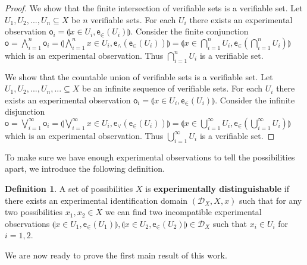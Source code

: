 \documentclass[preprint]{elsarticle}
\theoremstyle{plain}%
\theoremstyle{definition}
\newtheorem{defn}{Definition}[section]
\theoremstyle{remark}
\begin{document}
\begin{proof}
	We show that the finite intersection of verifiable sets is a verifiable set. Let $U_1, U_2, ... , U_n \subseteq X$ be $n$ verifiable sets. For each $U_i$ there exists an experimental observation $\mathsf{o}_i = \llparenthesis x\in U_i, \mathsf{e}_\in(U_i) \rrparenthesis$. Consider the finite conjunction $\mathsf{o} = \bigwedge\limits_{i=1}^{n} \mathsf{o}_i = \llparenthesis \bigwedge\limits_{i=1}^{n} x\in U_i , \mathsf{e}_{\wedge}(\mathsf{e}_\in(U_i)) \rrparenthesis=\llparenthesis x\in \bigcap\limits_{i=1}^{n} U_i, \mathsf{e}_\in(\bigcap\limits_{i=1}^{n} U_i)\rrparenthesis$ which is an experimental observation. Thus $\bigcap\limits_{i=1}^{n} U_i$ is a verifiable set.
	
	We show that the countable union of verifiable sets is a verifiable set. Let $U_1, U_2, ... , U_n, ... \subseteq X$ be an infinite sequence of verifiable sets. For each $U_i$ there exists an experimental observation $\mathsf{o}_i = \llparenthesis x\in U_i, \mathsf{e}_\in(U_i)\rrparenthesis$. Consider the infinite disjunction $\mathsf{o} = \bigvee\limits_{i=1}^{\infty} \mathsf{o}_i = \llparenthesis\bigvee\limits_{i=1}^{\infty} x\in U_i, \mathsf{e}_{\vee}(\mathsf{e}_\in(U_i))\rrparenthesis=\llparenthesis x\in \bigcup\limits_{i=1}^{\infty} U_i, \mathsf{e}_\in(\bigcup\limits_{i=1}^{\infty} U_i)\rrparenthesis$ which is an experimental observation. Thus $\bigcup\limits_{i=1}^{\infty} U_i$ is a verifiable set.
\end{proof}

To make sure we have enough experimental observations to tell the possibilities apart, we introduce the following definition.

\begin{defn}
A set of possibilities $X$ is \textbf{experimentally distinguishable} if there exists an experimental identification domain $(\mathcal{D}_X, X, x)$ such that for any two possibilities $x_1, x_2 \in X$ we can find two incompatible experimental observations $\llparenthesis x\in U_1, \mathsf{e}_\in(U_1)\rrparenthesis, \llparenthesis x\in U_2, \mathsf{e}_\in(U_2)\rrparenthesis\in\mathcal{D}_X$ such that $x_i\in U_i$ for $i=1,2$. 
\end{defn}

We are now ready to prove the first main result of this work.
\end{document}
